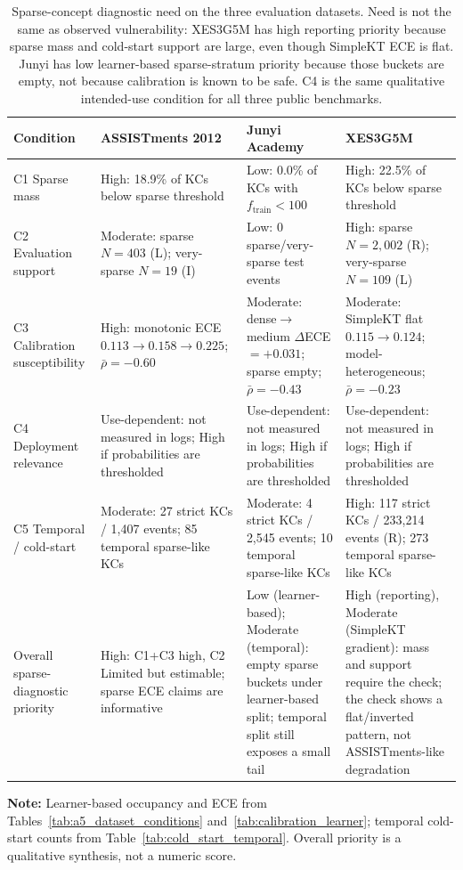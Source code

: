 \begin{table}[htbp]
\caption{Sparse-concept diagnostic need on the three evaluation datasets. Need is not the same as observed vulnerability: XES3G5M has high reporting priority because sparse mass and cold-start support are large, even though SimpleKT ECE is flat. Junyi has low learner-based sparse-stratum priority because those buckets are empty, not because calibration is known to be safe. C4 is the same qualitative intended-use condition for all three public benchmarks.}
\label{tab:a8_dataset_need}
\centering
\footnotesize
\setlength{\tabcolsep}{3.5pt}
\begin{tabularx}{\textwidth}{>{\raggedright\arraybackslash}p{2.8cm}XXX}
\toprule
\textbf{Condition} & \textbf{ASSISTments 2012} & \textbf{Junyi Academy} & \textbf{XES3G5M} \\
\midrule
C1 Sparse mass & High: 18.9\% of KCs below sparse threshold & Low: 0.0\% of KCs with $f_{\mathrm{train}}<100$ & High: 22.5\% of KCs below sparse threshold \\
\midrule
C2 Evaluation support & Moderate: sparse $N=403$ (L); very-sparse $N=19$ (I) & Low: 0 sparse/very-sparse test events & High: sparse $N=2{,}002$ (R); very-sparse $N=109$ (L) \\
\midrule
C3 Calibration susceptibility & High: monotonic ECE $0.113\to0.158\to0.225$; $\bar\rho=-0.60$ & Moderate: dense$\to$medium $\Delta$ECE$=+0.031$; sparse empty; $\bar\rho=-0.43$ & Moderate: SimpleKT flat $0.115\to0.124$; model-heterogeneous; $\bar\rho=-0.23$ \\
\midrule
C4 Deployment relevance & Use-dependent: not measured in logs; High if probabilities are thresholded & Use-dependent: not measured in logs; High if probabilities are thresholded & Use-dependent: not measured in logs; High if probabilities are thresholded \\
\midrule
C5 Temporal / cold-start & Moderate: 27 strict KCs / 1,407 events; 85 temporal sparse-like KCs & Moderate: 4 strict KCs / 2,545 events; 10 temporal sparse-like KCs & High: 117 strict KCs / 233,214 events (R); 273 temporal sparse-like KCs \\
\midrule
Overall sparse-diagnostic priority & High: C1+C3 high, C2 Limited but estimable; sparse ECE claims are informative & Low (learner-based); Moderate (temporal): empty sparse buckets under learner-based split; temporal split still exposes a small tail & High (reporting), Moderate (SimpleKT gradient): mass and support require the check; the check shows a flat/inverted pattern, not ASSISTments-like degradation \\
\bottomrule
\end{tabularx}

\vspace{1ex}
{\scriptsize \textbf{Note:} Learner-based occupancy and ECE from Tables~\ref{tab:a5_dataset_conditions} and~\ref{tab:calibration_learner}; temporal cold-start counts from Table~\ref{tab:cold_start_temporal}. Overall priority is a qualitative synthesis, not a numeric score.\par}
\end{table}
